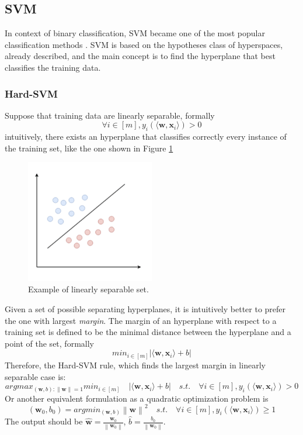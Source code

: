 \subsection{SVM}

In context of binary classification, \acl{SVM} became one of the most popular classification methods \cite{article-svm}. \ac{SVM} is based on the hypotheses class of hyperspaces, already described, and the main concept is to find the hyperplane that best classifies the training data.

\subsubsection{Hard-SVM}

Suppose that training data are linearly separable, formally
\[ \forall i \in [m], y_i (\langle \mathbf{w}, \mathbf{x}_i \rangle) > 0 \]
intuitively, there exists an hyperplane that classifies correctly every instance of the training set, like the one shown in Figure \ref{fig:linearly-separable}


\begin{figure}[ht]
	\centering
	\includegraphics[width=0.5\textwidth]{figures/linearly-separable.png}
	\caption{Example of linearly separable set.}
	\label{fig:linearly-separable}
\end{figure}

Given a set of possible separating hyperplanes, it is intuitively better to prefer the one with largest \textit{margin}. The margin of an hyperplane with respect to a training set is defined to be the minimal distance between the hyperplane and a point of the set, formally
\[ min_{i \in [m]} | \langle \mathbf{w}, \mathbf{x}_i \rangle + b | \]
Therefore, the Hard-\ac{SVM} rule, which finds the largest margin in linearly separable case is:
\[ argmax_{(\mathbf{w}, b) : \left\lVert \mathbf{w} \right\rVert = 1} min_{i \in [m]} \quad | \langle \mathbf{w}, \mathbf{x}_i \rangle + b | \quad s.t. \quad \forall i \in [m], y_i (\langle \mathbf{w}, \mathbf{x}_i \rangle) > 0 \]
Or another equivalent formulation as a quadratic optimization problem is
\[ (\mathbf{w}_0, b_0) = argmin_{(\mathbf{w}, b)} \left\lVert \mathbf{w} \right\rVert ^2 \quad s.t. \quad \forall i \in [m], y_i (\langle \mathbf{w}, \mathbf{x}_i \rangle) \ge 1 \]
The output should be $\hat{\mathbf{w}} = \frac{\mathbf{w}_0}{\left\lVert \mathbf{w}_0 \right\rVert}$, $\hat{b} = \frac{b_0}{\left\lVert \mathbf{w}_0 \right\rVert}$.


